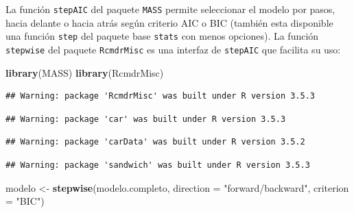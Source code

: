 \documentclass[]{book}
\newenvironment{Shaded}{\begin{snugshade}}{\end{snugshade}}
\newcommand{\KeywordTok}[1]{\textcolor[rgb]{0.13,0.29,0.53}{\textbf{#1}}}
\newcommand{\DataTypeTok}[1]{\textcolor[rgb]{0.13,0.29,0.53}{#1}}
\newcommand{\StringTok}[1]{\textcolor[rgb]{0.31,0.60,0.02}{#1}}
\newcommand{\NormalTok}[1]{#1}
\begin{document}
La función \texttt{stepAIC} del paquete \texttt{MASS} permite
seleccionar el modelo por pasos, hacia delante o hacia atrás según
criterio AIC o BIC (también esta disponible una función \texttt{step}
del paquete base \texttt{stats} con menos opciones). La función
\texttt{stepwise} del paquete \texttt{RcmdrMisc} es una interfaz de
\texttt{stepAIC} que facilita su uso:

\begin{Shaded}
\begin{Highlighting}[]
\KeywordTok{library}\NormalTok{(MASS)}
\KeywordTok{library}\NormalTok{(RcmdrMisc)}
\end{Highlighting}
\end{Shaded}

\begin{verbatim}
## Warning: package 'RcmdrMisc' was built under R version 3.5.3
\end{verbatim}

\begin{verbatim}
## Warning: package 'car' was built under R version 3.5.3
\end{verbatim}

\begin{verbatim}
## Warning: package 'carData' was built under R version 3.5.2
\end{verbatim}

\begin{verbatim}
## Warning: package 'sandwich' was built under R version 3.5.3
\end{verbatim}

\begin{Shaded}
\begin{Highlighting}[]
\NormalTok{modelo <-}\StringTok{ }\KeywordTok{stepwise}\NormalTok{(modelo.completo, }\DataTypeTok{direction =} \StringTok{"forward/backward"}\NormalTok{, }\DataTypeTok{criterion =} \StringTok{"BIC"}\NormalTok{)}
\end{Highlighting}
\end{Shaded}
\end{document}
